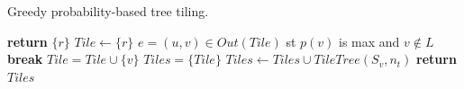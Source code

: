 



\begin{algorithm}
    \caption{Greedy probability-based tree tiling.}
    \label{Alg:GreedyTilingAlgo}
    \small{
    \begin{algorithmic}[1]
                \State \textbf{return} $\{ r \}$
            \EndIf
            \State $Tile \leftarrow \{ r \}$
                \State $e = (u,v) \in Out(Tile)$ st $p(v)$ is max and $v \notin L$
                    \State \textbf{break}
                \EndIf
                \State $Tile = Tile \cup \{ v \}$
            \EndWhile
            \State $Tiles =  \{ Tile \}$
                \State $Tiles \leftarrow Tiles \cup TileTree(S_v, n_t)$
            \EndFor
            \State \textbf{return} $Tiles$
        \EndProcedure
    \end{algorithmic}
    }
\end{algorithm}

